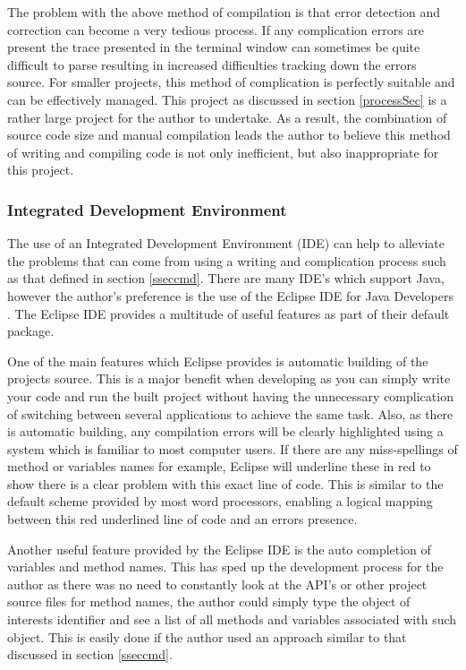 The problem with the above method of compilation is that error detection and correction can become a very tedious process. If any complication errors are present the trace presented in the terminal window can sometimes be quite difficult to parse resulting in increased difficulties tracking down the errors source. For smaller projects, this method of complication is perfectly suitable and can be effectively managed. This project as discussed in section \ref{processSec} is a rather large project for the author to undertake. As a result, the combination of source code size and manual compilation leads the author to believe this method of writing and compiling code is not only inefficient, but also inappropriate for this project.

\subsubsection{Integrated Development Environment}

The use of an Integrated Development Environment (IDE) can help to alleviate the problems that can come from using a writing and complication process such as that defined in section \ref{sseccmd}. There are many IDE's which support Java, however the author's preference is the use of the Eclipse IDE for Java Developers \cite{eclipse:IDE}. The Eclipse IDE provides a multitude of useful features as part of their default package. 

One of the main features which Eclipse provides is automatic building of the projects source. This is a major benefit when developing as you can simply write your code and run the built project without having the unnecessary complication of switching between several applications to achieve the same task. Also, as there is automatic building, any compilation errors will be clearly highlighted using a system which is familiar to most computer users. If there are any miss-spellings of method or variables names for example, Eclipse will underline these in red to show there is a clear problem with this exact line of code. This is similar to the default scheme provided by most word processors, enabling a logical mapping between this red underlined line of code and an errors presence.

Another useful feature provided by the Eclipse IDE is the auto completion of variables and method names. This has sped up the development process for the author as there was no need to constantly look at the API's or other project source files for method names, the author could simply type the object of interests identifier and see a list of all methods and variables associated with such object. This is easily done if the author used an approach similar to that discussed in section \ref{sseccmd}.

